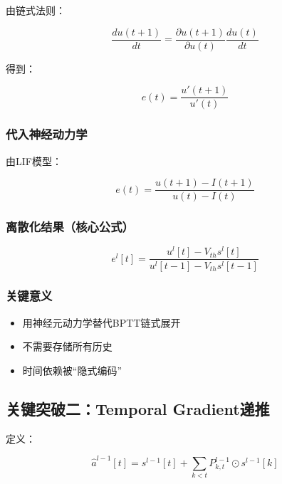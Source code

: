 \documentclass[journal,12pt,onecolumn]{IEEEtran}
\begin{document}
由链式法则：

\begin{equation}
\frac{d u(t+1)}{dt}
=
\frac{\partial u(t+1)}{\partial u(t)}
\frac{d u(t)}{dt}
\end{equation}

得到：

\begin{equation}
e(t) =
\frac{u'(t+1)}{u'(t)}
\end{equation}



\subsubsection{代入神经动力学}

由LIF模型：

\begin{equation}
e(t) =
\frac{u(t+1) - I(t+1)}{u(t) - I(t)}
\end{equation}



\subsubsection{离散化结果（核心公式）}

\begin{equation}
e^l[t]
=
\frac{u^l[t] - V_{th} s^l[t]}
{u^l[t-1] - V_{th} s^l[t-1]}
\end{equation}



\subsubsection{关键意义}

\begin{itemize}
\item 用神经元动力学替代BPTT链式展开
\item 不需要存储所有历史
\item 时间依赖被“隐式编码”
\end{itemize}



\subsection{关键突破二：Temporal Gradient递推}

定义：

\begin{equation}
\hat{a}^{l-1}[t]
=
s^{l-1}[t]
+
\sum_{k<t}
P^{l-1}_{k,t} \odot s^{l-1}[k]
\end{equation}
\end{document}
